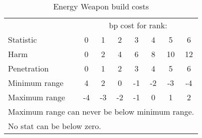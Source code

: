 
\begin{table}[ht]\centering
\begin{tabular}{l ccccccc}
\toprule
{}		& \multicolumn{7}{c}{bp cost for rank:} \\
Statistic	& 0	&1&2&3&4&5&6 \\
\midrule
Harm		&  0 &  2 &  4 &  6 &  8 & 10 & 12 \\
Penetration	&  0 &  1 &  2 &  3 &  4 &  5 &  6 \\
Minimum range	&  4 &  2 &  0 & -1 & -2 & -3 & -4 \\
Maximum range	& -4 & -3 & -2 & -1 &  0 &  1 &  2 \\
\bottomrule
\multicolumn{8}{p{0.7\columnwidth}}{
Maximum range can never be below minimum range.
}\\
\multicolumn{8}{p{0.7\columnwidth}}{
No stat can be below zero.
}
\end{tabular}
\caption{Energy Weapon build costs}
\label{tab:energy-weapon-build-costs}
\end{table}
